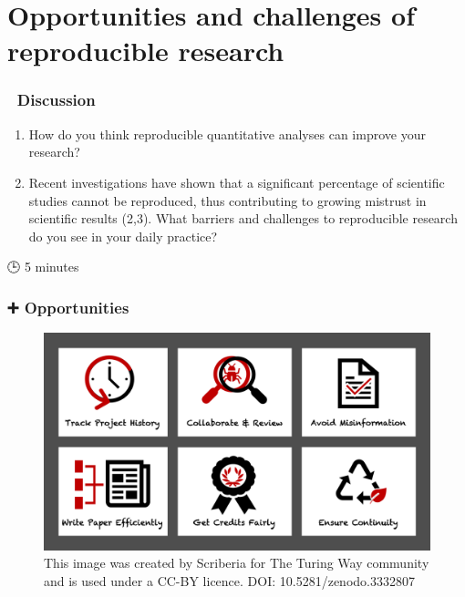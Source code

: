 \documentclass[
  letterpaper,
  DIV=11,
  numbers=noendperiod,
  oneside]{scrreprt}
\providecommand{\tightlist}{%
  \setlength{\itemsep}{0pt}\setlength{\parskip}{0pt}}\usepackage{longtable,booktabs,array}
\begin{document}
\hypertarget{opportunities-and-challenges-of-reproducible-research}{%
\section{Opportunities and challenges of reproducible
research}\label{opportunities-and-challenges-of-reproducible-research}}

\hypertarget{discussion}{%
\subsubsection{\texorpdfstring{{💬}
Discussion}{💬 Discussion}}\label{discussion}}

\begin{enumerate}
\def\labelenumi{\arabic{enumi}.}
\tightlist
\item
  How do you think reproducible quantitative analyses can improve your
  research?
\item
  Recent investigations have shown that a significant percentage of
  scientific studies cannot be reproduced, thus contributing to growing
  mistrust in scientific results (2,3). What barriers and challenges to
  reproducible research do you see in your daily practice?
\end{enumerate}

{🕒} 5 minutes

\hypertarget{opportunities}{%
\subsubsection{\texorpdfstring{{➕}
Opportunities}{➕ Opportunities}}\label{opportunities}}

\begin{figure}

{\centering \includegraphics{./images/paste-9DF4B400.png}

}

\caption{This image was created by Scriberia for The Turing Way
community and is used under a CC-BY licence. DOI:
10.5281/zenodo.3332807}

\end{figure}
\end{document}

